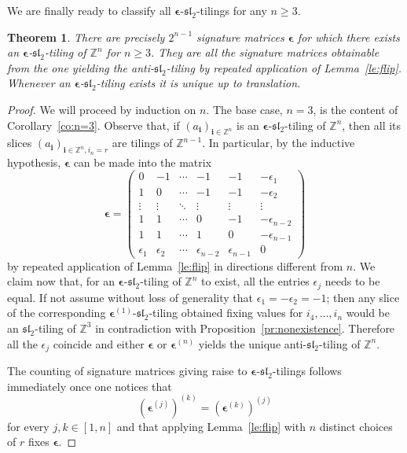 \documentclass{amsart}
\newtheorem{theorem}{Theorem}
\newcommand{\bepsilon}{\boldsymbol{\epsilon}}
\newcommand{\bi}{\boldsymbol{i}}
\newcommand{\fsl}{\mathfrak{sl}}
\newcommand{\ZZ}{\mathbb{Z}}
\begin{document}
  We are finally ready to classify all $\bepsilon$-$\fsl_2$-tilings for any $n\geq3$.
  \begin{theorem}
    There are precisely $2^{n-1}$ signature matrices $\bepsilon$ for which there exists an $\bepsilon$-$\fsl_2$-tiling of $\ZZ^n$ for $n\geq3$.
    They are all the signature matrices obtainable from the one yielding the anti-$\fsl_2$-tiling by repeated application of Lemma~\ref{le:flip}.
    Whenever an $\bepsilon$-$\fsl_2$-tiling exists it is unique up to translation.
  \end{theorem}
  \begin{proof}
    We will proceed by induction on $n$. 
    The base case, $n=3$, is the content of Corollary~\ref{co:n=3}.
    Observe that, if $(a_{\bi})_{\bi\in\ZZ^n}$ is an $\bepsilon$-$\fsl_2$-tiling of $\ZZ^n$, then all its slices $(a_{\bi})_{\bi\in\ZZ^n,i_n=r}$ are tilings of $\ZZ^{n-1}$.
    In particular, by the inductive hypothesis, $\bepsilon$ can be made into the matrix
    \[
      \bepsilon = 
      \left(
        \begin{array}{cccccc}
          0          & -1         & \cdots & -1             & -1             & -\epsilon_1     \\
          1          & 0          & \cdots & -1             & -1             & -\epsilon_2     \\
          \vdots     & \vdots     & \ddots & \vdots         & \vdots         & \vdots          \\
          1          & 1          & \cdots & 0              & -1             & -\epsilon_{n-2} \\
          1          & 1          & \cdots & 1              & 0              & -\epsilon_{n-1} \\
          \epsilon_1 & \epsilon_2 & \cdots & \epsilon_{n-2} & \epsilon_{n-1} & 0
        \end{array}
      \right)
    \]
    by repeated application of Lemma~\ref{le:flip} in directions different from $n$.
    We claim now that, for an $\bepsilon$-$\fsl_2$-tiling of $\ZZ^n$ to exist, all the entries $\epsilon_j$ needs to be equal. 
    If not assume without loss of generality that $\epsilon_1 = -\epsilon_2 = -1$; then any slice of the corresponding $\bepsilon^{(1)}$-$\fsl_2$-tiling obtained fixing values for $i_4,\dots,i_n$ would be an $\fsl_2$-tiling of $\ZZ^3$ in contradiction with Proposition~\ref{pr:nonexistence}.
    Therefore all the $\epsilon_j$ coincide and either $\bepsilon$ or $\bepsilon^{(n)}$ yields the unique anti-$\fsl_2$-tiling of $\ZZ^n$.

    The counting of signature matrices giving raise to $\bepsilon$-$\fsl_2$-tilings follows immediately once one notices that 
    \[
      \left(\bepsilon^{(j)}\right)^{(k)}=\left(\bepsilon^{(k)}\right)^{(j)}
    \]
    for every $j,k\in[1,n]$ and that applying Lemma~\ref{le:flip} with $n$ distinct choices of $r$ fixes $\bepsilon$.
  \end{proof}
\end{document}
